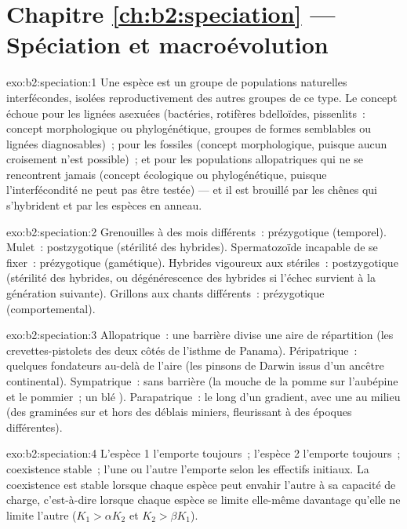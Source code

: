 \section*{Chapitre \ref{ch:b2:speciation} --- Spéciation et macroévolution}

\begin{solution}{exo:b2:speciation:1}
Une espèce est un groupe de populations naturelles interfécondes,
isolées reproductivement des autres groupes de ce type. Le concept échoue
pour les lignées asexuées (bactéries, rotifères bdelloïdes, pissenlits~:
concept morphologique ou phylogénétique, groupes de formes semblables ou
lignées diagnosables)~; pour les fossiles (concept morphologique, puisque
aucun croisement n'est possible)~; et pour les populations allopatriques
qui ne se rencontrent jamais (concept écologique ou phylogénétique,
puisque l'interfécondité ne peut pas être testée) --- et il est brouillé
par les chênes qui s'hybrident et par les espèces en anneau.
\end{solution}

\begin{solution}{exo:b2:speciation:2}
Grenouilles à des mois différents~: prézygotique (temporel). Mulet~:
postzygotique (stérilité des hybrides). Spermatozoïde incapable de se
fixer~: prézygotique (gamétique). Hybrides vigoureux aux 
stériles~: postzygotique (stérilité des hybrides, ou dégénérescence des
hybrides si l'échec survient à la génération suivante). Grillons aux
chants différents~: prézygotique (comportemental).
\end{solution}

\begin{solution}{exo:b2:speciation:3}
Allopatrique~: une barrière divise une aire de répartition (les
crevettes-pistolets des deux côtés de l'isthme de Panama). Péripatrique~:
quelques fondateurs au-delà de l'aire (les pinsons de Darwin issus d'un
ancêtre continental). Sympatrique~: sans barrière (la mouche de la pomme
sur l'aubépine et le pommier~; un blé ). Parapatrique~: le
long d'un gradient, avec une  au milieu (des graminées sur et
hors des déblais miniers, fleurissant à des époques différentes).
\end{solution}

\begin{solution}{exo:b2:speciation:4}
L'espèce 1 l'emporte toujours~; l'espèce 2 l'emporte toujours~;
coexistence stable~; l'une ou l'autre l'emporte selon les effectifs
initiaux. La coexistence est stable lorsque chaque espèce peut envahir
l'autre à sa capacité de charge, c'est-à-dire lorsque chaque espèce se
limite elle-même davantage qu'elle ne limite l'autre
($K_1 > \alpha K_2$ et $K_2 > \beta K_1$).
\end{solution}

